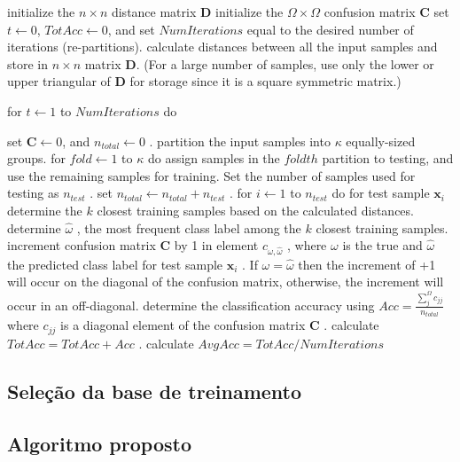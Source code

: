 \documentclass[
	article,			%
	11pt,				%
	oneside,			%
	a4paper,			%
	english,			%
	brazil,				%
	sumario=tradicional
	]{abntex2}
\begin{document}
initialize the $n \times n$ distance matrix $\textbf{D}$ \newline
initialize the $\Omega \times \Omega$ confusion matrix $\textbf{C}$ \newline
set $t \leftarrow 0$,
$TotAcc \leftarrow 0$, and set $NumIterations$ equal to the desired number of
 iterations (re-partitions). \newline
calculate distances between all the input samples and store in $n \times n$
matrix $\textbf{D} $. (For a large number of samples, use only the lower or
upper triangular of $\textbf{D}$ for storage since it is a square symmetric
matrix.)

for $t \leftarrow 1$ to $NumIterations$ do

set $\textbf{C} \leftarrow 0$, and $n_{total} \leftarrow 0$ .
partition the input samples into $\kappa$ equally-sized groups.
for $fold \leftarrow 1$ to $\kappa$\newline 
do assign samples in the $foldth$ partition
to testing, and use the remaining samples for training. Set the number of samples
used for testing as $n_{test}$ .\newline
set $n_{total} \leftarrow n_{total}+n_{test}$ .
for $i \leftarrow 1$ to $n_{test}$\newline 
do for test sample $\textbf{x}_i$ determine the
$k$ closest training samples based on the calculated distances.
determine $\hat{\omega}$ , the most frequent class label among the $k$ closest
training samples.
increment confusion matrix $\textbf{C}$ by 1 in element
$c_{\omega,\hat{\omega}}$ , where $\omega$ is the true and $\hat{\omega}$ the
predicted class label for test sample $\textbf{x}_i$ . If $\omega =\hat{\omega}$
then the increment of +1 will occur on the diagonal of the confusion matrix, otherwise, the increment will
occur in an off-diagonal.
determine the classification accuracy using $Acc =
\frac{\sum_j^{\Omega}c_{jj}}{n_{total}}$ where $c_{jj}$ is a diagonal element of
the confusion matrix $\textbf{C}$ .
calculate $TotAcc = TotAcc + Acc$ .
calculate $AvgAcc = TotAcc/NumIterations$


\subsection{Seleção da base de treinamento}

\subsection{Algoritmo proposto}
\end{document}
